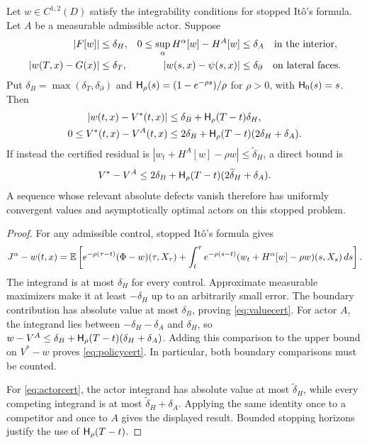 \begin{theorem}\label{thm:certificate}
Let $w\in C^{1,2}(D)$ satisfy the integrability conditions for stopped It\^o's formula. Let $A$ be a measurable admissible actor. Suppose
\begin{align*}
 |F[w]|&\leq\delta_H, &
 0\leq\sup_\alpha H^\alpha[w]-H^A[w]&\leq\delta_A \quad\hbox{in the interior},\\
 |w(T,x)-G(x)|&\leq\delta_T, &
 |w(s,x)-\psi(s,x)|&\leq\delta_\partial \quad\hbox{on lateral faces}.
\end{align*}
Put $\delta_B=\max(\delta_T,\delta_\partial)$ and
$\mathsf H_\rho(s)=(1-e^{-\rho s})/\rho$ for $\rho>0$, with $\mathsf H_0(s)=s$. Then
\begin{align}
 |w(t,x)-V^*(t,x)|&\leq\delta_B+\mathsf H_\rho(T-t)\delta_H,\label{eq:valuecert}\\
 0\leq V^*(t,x)-V^A(t,x)&\leq
 2\delta_B+\mathsf H_\rho(T-t)(2\delta_H+\delta_A).\label{eq:policycert}
\end{align}
If instead the certified residual is $|w_t+H^A[w]-\rho w|\leq\widetilde\delta_H$, a direct bound is
\begin{equation}\label{eq:actorcert}
 V^*-V^A\leq2\delta_B+\mathsf H_\rho(T-t)(2\widetilde\delta_H+\delta_A).
\end{equation}
A sequence whose relevant absolute defects vanish therefore has uniformly convergent values and asymptotically optimal actors on this stopped problem.
\end{theorem}
\begin{proof}
For any admissible control, stopped It\^o's formula gives
\[
 J^\alpha-w(t,x)=\mathbb E\left[e^{-\rho(\tau-t)}(\Phi-w)(\tau,X_\tau)
 +\int_t^\tau e^{-\rho(s-t)}(w_t+H^\alpha[w]-\rho w)(s,X_s)\,ds\right].
\]
The integrand is at most $\delta_H$ for every control. Approximate measurable maximizers make it at least $-\delta_H$ up to an arbitrarily small error. The boundary contribution has absolute value at most $\delta_B$, proving \eqref{eq:valuecert}. For actor $A$, the integrand lies between $-\delta_H-\delta_A$ and $\delta_H$, so $w-V^A\leq\delta_B+\mathsf H_\rho(T-t)(\delta_H+\delta_A)$. Adding this comparison to the upper bound on $V^*-w$ proves \eqref{eq:policycert}. In particular, both boundary comparisons must be counted.

For \eqref{eq:actorcert}, the actor integrand has absolute value at most $\widetilde\delta_H$, while every competing integrand is at most $\widetilde\delta_H+\delta_A$. Applying the same identity once to a competitor and once to $A$ gives the displayed result. Bounded stopping horizons justify the use of $\mathsf H_\rho(T-t)$.\end{proof}


